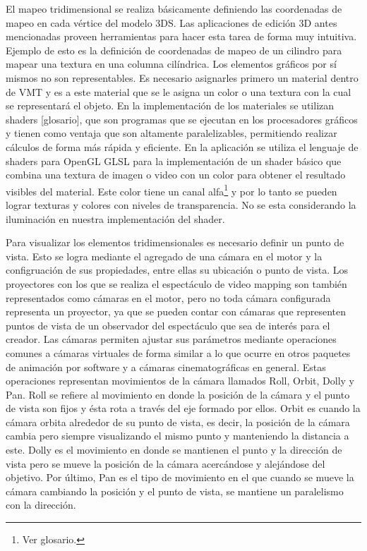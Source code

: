 El mapeo tridimensional se realiza básicamente definiendo las coordenadas de mapeo en cada vértice del modelo 3DS. Las aplicaciones de edición 3D antes mencionadas proveen herramientas para hacer esta tarea de forma muy intuitiva. Ejemplo de esto es la definición de coordenadas de mapeo de un cilindro para mapear una textura en una columna cilíndrica.
Los elementos gráficos por sí mismos no son representables. Es necesario asignarles primero un material dentro de VMT y es a este material que se le asigna un color o una textura con la cual se representará el objeto.
En la implementación de los materiales se utilizan shaders [glosario], que son programas que se ejecutan en los procesadores gráficos y tienen como ventaja que son altamente paralelizables, permitiendo realizar cálculos de forma más rápida y eficiente. En la aplicación se utiliza el lenguaje de shaders para OpenGL GLSL\cite{GLSL} para la implementación de un shader básico que combina una textura de imagen o video con un color para obtener el resultado visibles del material. Este color tiene un canal alfa\footnote{Ver glosario.} y por lo tanto se pueden lograr texturas y colores con niveles de transparencia. No se esta considerando la iluminación en nuestra implementación del shader.

Para visualizar los elementos tridimensionales es necesario definir un punto de vista. Esto se logra mediante el agregado de una cámara en el motor y la configruación de sus propiedades, entre ellas su ubicación o punto de vista. Los proyectores con los que se realiza el espectáculo de video mapping son también representados como cámaras en el motor, pero no toda cámara configurada representa un proyector, ya que se pueden contar con cámaras que representen puntos de vista de un observador del espectáculo que sea de interés para el creador.
Las cámaras permiten ajustar sus parámetros mediante operaciones comunes a cámaras virtuales de forma similar a lo que ocurre en otros paquetes de animación por software y a cámaras cinematográficas en general. Estas operaciones representan movimientos de la cámara llamados Roll, Orbit, Dolly y Pan. Roll se refiere al movimiento en donde la posición de la cámara y el punto de vista son fijos y ésta rota a través del eje formado por ellos. Orbit es cuando la cámara orbita alrededor de su punto de vista, es decir, la posición de la cámara cambia pero siempre visualizando el mismo punto y manteniendo la distancia a este. Dolly es el movimiento en donde se mantienen el punto y la dirección de vista pero se mueve la posición de la cámara acercándose y alejándose del objetivo. Por último, Pan es el tipo de movimiento en el que cuando se mueve la cámara cambiando la posición y el punto de vista, se mantiene un paralelismo con la dirección.

